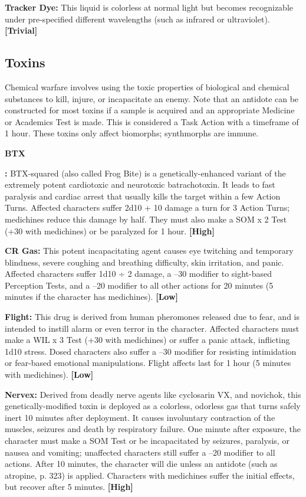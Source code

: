 \textbf{Tracker Dye:} This liquid is colorless at normal light 
but becomes recognizable under pre-specified different 
wavelengths (such as infrared or ultraviolet). \textbf{[Trivial]}

\subsection{Toxins}

Chemical warfare involves using the toxic properties 
of biological and chemical substances to kill, injure, 
or incapacitate an enemy. Note that an antidote can 
be constructed for most toxins if a sample is acquired 
and an appropriate Medicine or Academics Test is 
made. This is considered a Task Action with a timeframe
of 1 hour. These toxins only affect biomorphs;
synthmorphs are immune.

\textbf{BTX}

\textbf{:} BTX-squared (also called Frog Bite) is a 
genetically-enhanced variant of the extremely potent 
cardiotoxic and neurotoxic batrachotoxin. It leads to 
fast paralysis and cardiac arrest that usually kills the 
target within a few Action Turns. Affected characters 
suffer 2d10 + 10 damage a turn for 3 Action Turns; 
medichines reduce this damage by half. They must 
also make a SOM x 2 Test (+30 with medichines) or 
be paralyzed for 1 hour. \textbf{[High]}

\textbf{CR Gas:} This potent incapacitating agent causes 
eye twitching and temporary blindness, severe coughing
and breathing difficulty, skin irritation, and panic.
Affected characters suffer 1d10 ÷ 2 damage, a –30 
modifier to sight-based Perception Tests, and a –20 
modifier to all other actions for 20 minutes (5 minutes
if the character has medichines). \textbf{[Low]}

\textbf{Flight:} This drug is derived from human pheromones 
released due to fear, and is intended to instill alarm or 
even terror in the character. Affected characters must 
make a WIL x 3 Test (+30 with medichines) or suffer 
a panic attack, inflicting 1d10 stress. Dosed characters 
also suffer a –30 modifier for resisting intimidation or 
fear-based emotional manipulations. Flight affects last 
for 1 hour (5 minutes with medichines). \textbf{[Low]}

\textbf{Nervex:} Derived from deadly nerve agents like cyclosarin
VX, and novichok, this genetically-modified
toxin is deployed as a colorless, odorless gas that 
turns safely inert 10 minutes after deployment. It 
causes involuntary contraction of the muscles, seizures
and death by respiratory failure. One minute
after exposure, the character must make a SOM Test 
or be incapacitated by seizures, paralysis, or nausea 
and vomiting; unaffected characters still suffer a –20 
modifier to all actions. After 10 minutes, the character 
will die unless an antidote (such as atropine, p. 323) is 
applied. Characters with medichines suffer the initial 
effects, but recover after 5 minutes. \textbf{[High]}

